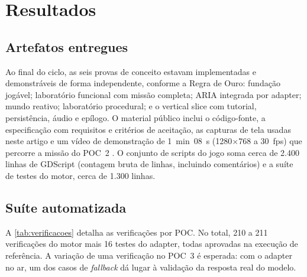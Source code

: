 \section{Resultados}
\label{sec:resultados}

\subsection{Artefatos entregues}

Ao final do ciclo, as seis provas de conceito estavam implementadas e
demonstráveis de forma independente, conforme a Regra de Ouro: fundação
jogável; laboratório funcional com missão completa; ARIA integrada por adapter;
mundo reativo; laboratório procedural; e o vertical slice com tutorial,
persistência, áudio e epílogo. O material público inclui o código-fonte, a
especificação com requisitos e critérios de aceitação, as capturas de tela
usadas neste artigo e um vídeo de demonstração de 1~min~08~s
(1280$\times$768 a 30~fps) que percorre a missão do POC~2
\citep{lab404repo,lab404video}. O conjunto de scripts do jogo soma cerca de
2.400 linhas de GDScript (contagem bruta de linhas, incluindo comentários) e a
suíte de testes do motor, cerca de 1.300 linhas.

\subsection{Suíte automatizada}

A \autoref{tab:verificacoes} detalha as verificações por POC. No total, 210 a
211 verificações do motor mais 16 testes do adapter, todas aprovadas na
execução de referência. A variação de uma verificação no POC~3 é esperada: com
o adapter no ar, um dos casos de \emph{fallback} dá lugar à validação da
resposta real do modelo.

